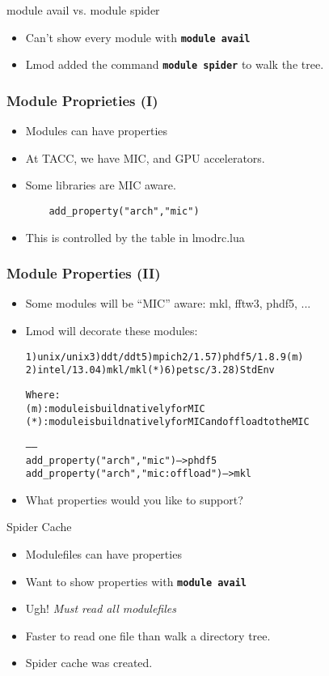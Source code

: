 \documentclass{beamer}
\begin{document}
\begin{frame}{module avail vs. module spider}
  \begin{itemize}
     \item Can't show every module with \texttt{\bf module avail}
     \item Lmod added the command \texttt{\bf module spider} to walk
       the tree.
  \end{itemize}
\end{frame}
\begin{frame}[fragile]
    \frametitle{Module Proprieties (I)}
  \begin{itemize}
    \item Modules can have properties
    \item At TACC, we have MIC, and GPU accelerators.
    \item Some libraries are MIC aware.
    {\small
\begin{verbatim}
    add_property("arch","mic")
\end{verbatim}
}
    \item This is controlled by the table in lmodrc.lua
  \end{itemize}
\end{frame}

\begin{frame}[fragile]
    \frametitle{Module Properties (II)}
  \begin{itemize}
    \item Some modules will be ``MIC'' aware: mkl, fftw3, phdf5, ...
    \item Lmod will decorate these modules:
  {\tiny
    \begin{alltt}
  1) unix/unix     3) ddt/ddt       5) mpich2/1.5    7) phdf5/1.8.9 {\color{blue}(m)}
  2) intel/13.0    4) mkl/mkl {\color{red}(*)}   6) petsc/3.2     8) StdEnv

  Where:
   {\color{blue}(m)}:  module is build natively for MIC
   {\color{red}(*)}:  module is build natively for MIC and offload to the MIC

   ------
   add_property("arch","mic")              -- > phdf5
   add_property("arch","mic:offload")      -- > mkl
    \end{alltt}
}
  \item What properties would you like to support?
  \end{itemize}
\end{frame}

\begin{frame}{Spider Cache}
  \begin{itemize}
      \item Modulefiles can have properties
      \item Want to show properties with \texttt{\bf module avail}
      \item Ugh! \emph{Must read all modulefiles}
      \item Faster to read one file than walk a directory tree.
      \item Spider cache was created.
  \end{itemize}
\end{frame}
\end{document}
